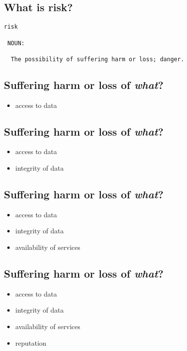 \documentclass[xga]{xdvislides}
\begin{document}
\subsection{What is risk?}
\Huge
\begin{verbatim}
risk

 NOUN:

  The possibility of suffering harm or loss; danger.
\end{verbatim}
\Normalsize

\subsection{Suffering harm or loss of {\em what}?}

\begin{itemize}
	\item access to data
\end{itemize}

\subsection{Suffering harm or loss of {\em what}?}

\begin{itemize}
	\item access to data
	\item integrity of data
\end{itemize}

\subsection{Suffering harm or loss of {\em what}?}

\begin{itemize}
	\item access to data
	\item integrity of data
	\item availability of services
\end{itemize}

\subsection{Suffering harm or loss of {\em what}?}

\begin{itemize}
	\item access to data
	\item integrity of data
	\item availability of services
	\item reputation
\end{itemize}
\end{document}
